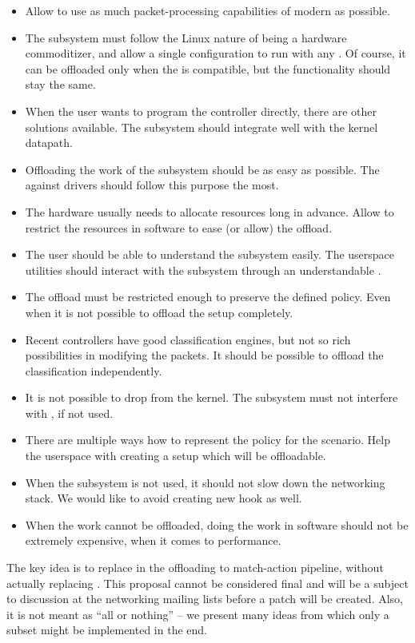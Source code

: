 \begin{itemize}
	\item Allow to use as much packet-processing capabilities of modern 
		as possible.
	\item The subsystem must follow the Linux nature of being a hardware
		commoditizer, and allow a single configuration to run with any .
		Of course, it can be offloaded only when the  is compatible, but
		the functionality should stay the same.
	\item When the user wants to program the controller directly, there are
		other solutions available. The subsystem should integrate well with the
		kernel datapath.
	\item Offloading the work of the subsystem should be as easy as possible.
		The  against drivers should follow this purpose the most.
	\item The hardware usually needs to allocate resources long in advance.
		Allow to restrict the resources in software to ease (or allow) the
		offload.
	\item The user should be able to understand the subsystem easily. The
		userspace utilities should interact with the subsystem through an
		understandable .
	\item The offload must be restricted enough to preserve the defined policy.
		Even when it is not possible to offload the setup completely.
	\item Recent controllers have good classification engines, but not so rich
		possibilities in modifying the packets. It should be possible to
		offload the classification independently.
	\item It is not possible to drop  from the kernel. The subsystem must
		not interfere with , if not used.
	\item There are multiple ways how to represent the policy for the scenario.
		Help the userspace with creating a setup which will be offloadable.
	\item When the subsystem is not used, it should not slow down the
		networking stack. We would like to avoid creating new hook as well.
	\item When the work cannot be offloaded, doing the work in software should
		not be extremely expensive, when it comes to performance.
\end{itemize}

\noindent The key idea is to replace  in the offloading to match-action pipeline,
without actually replacing . This proposal cannot be considered final and
will be a subject to discussion at the networking mailing lists before a patch
will be created. Also, it is not meant as ``all or nothing'' -- we present many
ideas from which only a subset might be implemented in the end.

